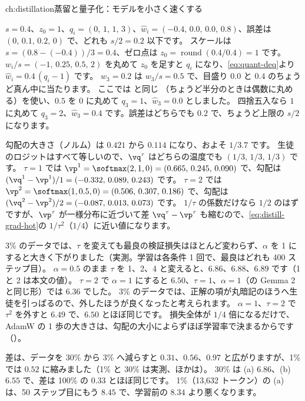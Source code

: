 \begin{answers}{ch:distillation}{蒸留と量子化：モデルを小さく速くする}
\item $s=0.4$、$z_0=1$、$q_i=(0,\,1,\,1,\,3)$、$\hat w_i=(-0.4,\,0.0,\,0.0,\,0.8)$、誤差は $(0,\,0.1,\,0.2,\,0)$ で、どれも $s/2=0.2$ 以下です。
スケールは $s=(0.8-(-0.4))/3=0.4$、ゼロ点は $z_0=\operatorname{round}(0.4/0.4)=1$ です。
$w_i/s=(-1,\,0.25,\,0.5,\,2)$ を丸めて $z_0$ を足すと $q_i$ になり、\eqref{eq:quant-deq}より $\hat w_i=0.4\,(q_i-1)$ です。
$w_3=0.2$ は $w_3/s=0.5$ で、目盛り $0.0$ と $0.4$ のちょうど真ん中に当たります。
ここでは  と同じ （ちょうど半分のときは偶数に丸める）を使い、$0.5$ を $0$ に丸めて $q_3=1$、$\hat w_3=0.0$ としました。
四捨五入なら $1$ に丸めて $q_3=2$、$\hat w_3=0.4$ です。誤差はどちらでも $0.2$ で、ちょうど上限の $s/2$ になります。
\item 勾配の大きさ（ノルム）は $0.421$ から $0.114$ になり、およそ $1/3.7$ です。
生徒のロジットはすべて等しいので、$\vq^\tau$ はどちらの温度でも $(1/3,\,1/3,\,1/3)$ です。
$\tau=1$ では $\vp^1=\softmax(2,1,0)=(0.665,\,0.245,\,0.090)$ で、勾配は $(\vq^1-\vp^1)/1=(-0.332,\,0.089,\,0.243)$ です。
$\tau=2$ では $\vp^2=\softmax(1,0.5,0)=(0.506,\,0.307,\,0.186)$ で、勾配は $(\vq^2-\vp^2)/2=(-0.087,\,0.013,\,0.073)$ です。
$1/\tau$ の係数だけなら $1/2$ のはずですが、$\vp^\tau$ が一様分布に近づいて差 $\vq^\tau-\vp^\tau$ も縮むので、\eqref{eq:distill-grad-hot}の $1/\tau^2$（$1/4$）に近い値になります。
\item 3\% のデータでは、$\tau$ を変えても最良の検証損失はほとんど変わらず、$\alpha$ を 1 にすると大きく下がりました（実測。学習は各条件 1 回で、最良はどれも 400 ステップ目）。
$\alpha=0.5$ のまま $\tau$ を 1、2、4 と変えると、$6.86$、$6.88$、$6.89$ です（1 と 2 は本文の値）。
$\tau=2$ で $\alpha=1$ にすると $6.50$、$\tau=1$、$\alpha=1$（の Gemma 2 と同じ形）では $6.36$ でした。
3\% のデータでは、正解の項が丸暗記のほうへ生徒を引っぱるので、外したほうが良くなったと考えられます。
$\alpha=1$、$\tau=2$ で $\tau^2$ を外すと $6.49$ で、$6.50$ とほぼ同じです。
損失全体が $1/4$ 倍になるだけで、AdamW の 1 歩の大きさは、勾配の大小によらずほぼ学習率で決まるからです（）。
\item 差は、データを 30\% から 3\% へ減らすと $0.31$、$0.56$、$0.97$ と広がりますが、1\% では $0.52$ に縮みました（1\% と 30\% は実測、ほかは）。
30\% は (a) $6.86$、(b) $6.55$ で、差は 100\% の $0.33$ とほぼ同じです。
1\%（13,632 トークン）の (a) は、50 ステップ目にもう $8.45$ で、学習前の $8.34$ より悪くなります。

\end{answers}
